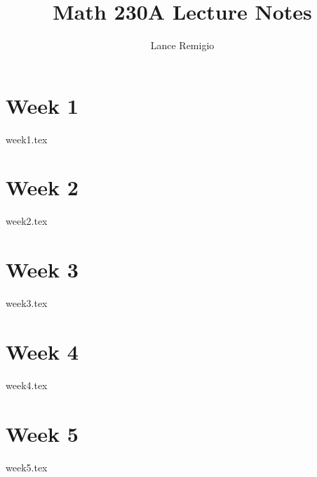 \documentclass{report}
\title{Math 230A Lecture Notes}
\author{Lance Remigio}
\begin{document}
\maketitle 
\tableofcontents


\chapter{Week 1}

{week1.tex}

\chapter{Week 2}

{week2.tex}

\chapter{Week 3}

{week3.tex}

\chapter{Week 4}

{week4.tex}

\chapter{Week 5}

{week5.tex}
\end{document}
